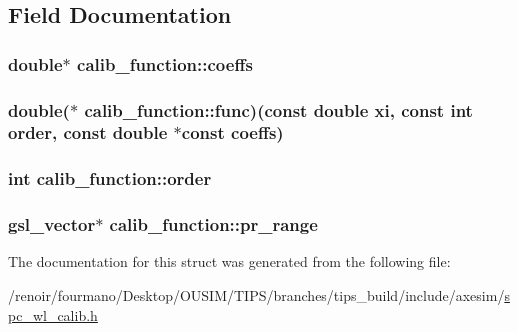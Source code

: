 \subsection{Field Documentation}
\hypertarget{structcalib__function_af6161163d6abff34648d027533dbc89e}{
\subsubsection[{coeffs}]{\setlength{\rightskip}{0pt plus 5cm}double$\ast$ {\bf calib\_\-function::coeffs}}}
\label{structcalib__function_af6161163d6abff34648d027533dbc89e}
\hypertarget{structcalib__function_af3b6ef00cf4dfcfc75e8f129c555d99f}{
\subsubsection[{func}]{\setlength{\rightskip}{0pt plus 5cm}double($\ast$ {\bf calib\_\-function::func})(const double xi, const int {\bf order}, const double $\ast$const {\bf coeffs})}}
\label{structcalib__function_af3b6ef00cf4dfcfc75e8f129c555d99f}
\hypertarget{structcalib__function_a0c2f4bb6aac5dbd2ce276ed8bee280da}{
\subsubsection[{order}]{\setlength{\rightskip}{0pt plus 5cm}int {\bf calib\_\-function::order}}}
\label{structcalib__function_a0c2f4bb6aac5dbd2ce276ed8bee280da}
\hypertarget{structcalib__function_a585ddafa8bb9e1ac0b7a3da3410b5f80}{
\subsubsection[{pr\_\-range}]{\setlength{\rightskip}{0pt plus 5cm}gsl\_\-vector$\ast$ {\bf calib\_\-function::pr\_\-range}}}
\label{structcalib__function_a585ddafa8bb9e1ac0b7a3da3410b5f80}


The documentation for this struct was generated from the following file:\begin{DoxyCompactItemize}
\item 
/renoir/fourmano/Desktop/OUSIM/TIPS/branches/tips\_\-build/include/axesim/\hyperlink{spc__wl__calib_8h}{spc\_\-wl\_\-calib.h}\end{DoxyCompactItemize}
